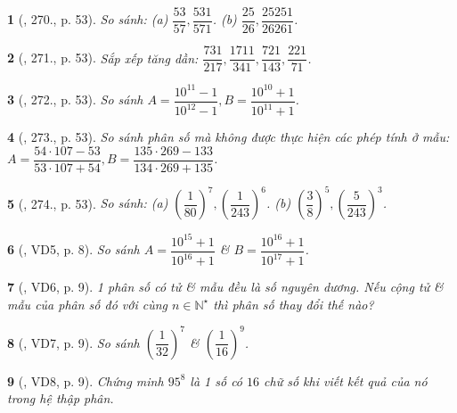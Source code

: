 \documentclass{article}
\newtheorem{baitoan}{}
\begin{document}
\begin{baitoan}[\cite{Tuyen_Toan_6}, 270., p. 53]
	So sánh: (a) $\dfrac{53}{57},\dfrac{531}{571}$. (b) $\dfrac{25}{26},\dfrac{25251}{26261}$.
\end{baitoan}

\begin{baitoan}[\cite{Tuyen_Toan_6}, 271., p. 53]
	Sắp xếp tăng dần: $\dfrac{731}{217},\dfrac{1711}{341},\dfrac{721}{143},\dfrac{221}{71}$.
\end{baitoan}

\begin{baitoan}[\cite{Tuyen_Toan_6}, 272., p. 53]
	So sánh $A = \dfrac{10^{11} - 1}{10^{12} - 1},B = \dfrac{10^{10} + 1}{10^{11} + 1}$.
\end{baitoan}

\begin{baitoan}[\cite{Tuyen_Toan_6}, 273., p. 53]
	So sánh phân số mà không được thực hiện các phép tính ở mẫu: $A = \dfrac{54\cdot107 - 53}{53\cdot107 + 54},B = \dfrac{135\cdot269 - 133}{134\cdot269 + 135}$.
\end{baitoan}

\begin{baitoan}[\cite{Tuyen_Toan_6}, 274., p. 53]
	So sánh: (a) $\left(\dfrac{1}{80}\right)^7,\left(\dfrac{1}{243}\right)^6$. (b) $\left(\dfrac{3}{8}\right)^5,\left(\dfrac{5}{243}\right)^3$.
\end{baitoan}

\begin{baitoan}[\cite{Binh_Toan_6_tap_2}, VD5, p. 8]
	So sánh $A = \dfrac{10^{15} + 1}{10^{16} + 1}$ \& $B = \dfrac{10^{16} + 1}{10^{17} + 1}$.
\end{baitoan}

\begin{baitoan}[\cite{Binh_Toan_6_tap_2}, VD6, p. 9]
	1 phân số có tử \& mẫu đều là số nguyên dương. Nếu cộng tử \& mẫu của phân số đó với cùng $n\in\mathbb{N}^\star$ thì phân số thay đổi thế nào?
\end{baitoan}

\begin{baitoan}[\cite{Binh_Toan_6_tap_2}, VD7, p. 9]
	So sánh $\left(\dfrac{1}{32}\right)^7$ \& $\left(\dfrac{1}{16}\right)^9$.
\end{baitoan}

\begin{baitoan}[\cite{Binh_Toan_6_tap_2}, VD8, p. 9]
	Chứng minh $95^8$ là 1 số có $16$ chữ số khi viết kết quả của nó trong hệ thập phân.
\end{baitoan}
\end{document}
